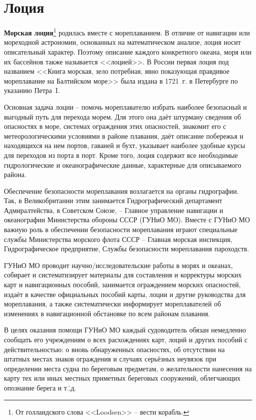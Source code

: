 \twocolumn

\chapter{Лоция}

\textbf{Морская лоция}\footnote{От голландского слова <<Loodsen>> \---
  вести корабль.} родилась вместе с мореплаванием. В отличие от
навигации или мореходной астрономии, основанных на математическом
анализе, лоция носит описательный характер. Поэтому описание каждого
конкретного океана, моря или их бассейнов также называется
<<лоцией>>. В России первая лоция под названием <<Книга морская, зело
потребная, явно показующая правдивое мореплавание на Балтийском море>>
была издана в 1721~г. в Петербурге по указанию Петра~I.

Основная задача лоции \--- помочь мореплавателю избрать наиболее
безопасный и выгодный путь для перехода морем. Для этого она даёт
штурману сведения об опасностях в море, системах ограждения этих
опасностей, знакомит его с метеорологическими условиями в районе
плавания, даёт описание побережья и находящихся на нем портов, гаваней
и бухт, указывает наиболее удобные курсы для переходов из порта в
порт. Кроме того, лоция содержит все необходимые гидрологические и
океанографические данные, характерные для описываемого района.

Обеспечение безопасности мореплавания возлагается на органы
гидрографии. Так, в Великобритании этим занимается Гидрографический
департамент Адмиралтейства, в Советском Союзе, \--- Главное управление
навигации и океанографии Министерства обороны СССР (ГУНиО МО). Вместе
с ГУНиО МО важную роль в обеспечении безопасности мореплавания играют
специальные службы Министерства морского флота СССР \--- Главная
морская инспекция, Гидрографическое предприятие, Службы безопасности
мореплавания пароходств.

ГУНиО МО проводит научно\-/исследовательские работы в морях и океанах,
собирает и систематизирует материалы для составления и корректуры
морских карт и навигационных пособий, занимается ограждением морских
опасностей, издаёт в качестве официальных пособий карты, лоции и
другие руководства для мореплавания, а также систематически
информирует мореплавателей об изменениях в навигационной обстановке по
всем районам плавания.

В целях оказания помощи ГУНиО МО каждый судоводитель обязан немедленно
сообщать его учреждениям о всех расхождениях карт, лоций и других
пособий с действительностью: о вновь обнаруженных опасностях, об
отсутствии на штатных местах знаков ограждения и случаях серьёзных
неувязок при определении места судна по береговым предметам, о
желательности нанесения на карту тех или иных местных приметных
береговых сооружений, облегчающих опознание берега и т.\=,д.

